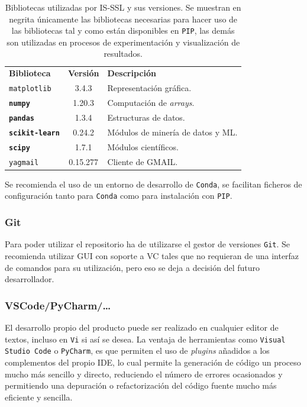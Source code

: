 \begin{table}[]
\centering
\begin{tabular}{lcl}
	\toprule
	\textbf{Biblioteca} & \textbf{Versión} & \textbf{Descripción}\\ \rowcolor[HTML]{EFEFEF} 
	\midrule
	\rowcolor[HTML]{EFEFEF} 
	\texttt{matplotlib}    & 3.4.3   & Representación gráfica.   \\  
	\textbf{\texttt{numpy}}    & 1.20.3 &  Computación de \textit{arrays}.  \\ \rowcolor[HTML]{EFEFEF} 
	\textbf{\texttt{pandas}}    & 1.3.4  & Estructuras de datos.    \\  
	\textbf{\texttt{scikit-learn}}    & 0.24.2 & Módulos de minería de datos y ML.   \\ \rowcolor[HTML]{EFEFEF} 
	\textbf{\texttt{scipy}}    & 1.7.1  & Módulos científicos.    \\ 
	\texttt{yagmail}    & 0.15.277  & Cliente de GMAIL.    \\ 
	\bottomrule
\end{tabular}
\caption{Bibliotecas utilizadas por IS-SSL y sus versiones. Se muestran en negrita únicamente las bibliotecas necesarias para hacer uso de las bibliotecas tal y como están disponibles en \texttt{PIP}, las demás son utilizadas en procesos de experimentación y visualización de resultados.}\label{tab:bibliotecas-python-is-ssl}
\end{table}

Se recomienda el uso de un entorno de desarrollo de \texttt{Conda}, se facilitan ficheros de configuración tanto para \texttt{Conda} como para instalación con \texttt{PIP}.

\subsubsection{Git}
Para poder utilizar el repositorio ha de utilizarse el gestor de versiones \texttt{Git}. Se recomienda utilizar GUI con soporte a VC tales que no requieran de una interfaz de comandos para su utilización, pero eso se deja a decisión del futuro desarrollador.

\subsubsection{VSCode/PyCharm/\dots}
El desarrollo propio del producto puede ser realizado en cualquier editor de textos, incluso en \texttt{Vi} si así se desea. La ventaja de herramientas como \texttt{Visual Studio Code} o \texttt{PyCharm}, es que permiten el uso de \textit{plugins} añadidos a los complementos del propio IDE, lo cual permite la generación de código un proceso mucho más sencillo y directo, reduciendo el número de errores ocasionados y permitiendo una depuración o refactorización del código fuente mucho más eficiente y sencilla.

